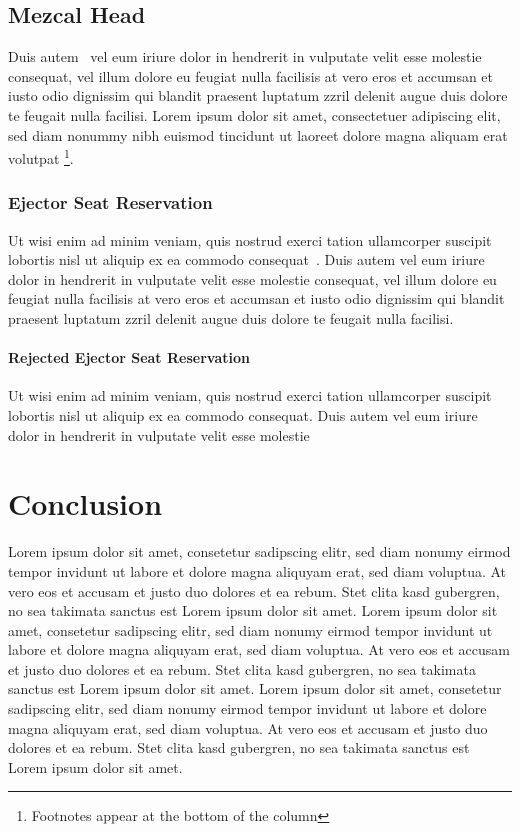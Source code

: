 \documentclass{vgtc}                          %
\begin{document}
\subsection{Mezcal Head}

Duis autem~\cite{Lorensen:1987:MCA} vel eum iriure dolor in hendrerit
in vulputate velit esse molestie consequat, vel illum dolore eu
feugiat nulla facilisis at vero eros et accumsan et iusto odio
dignissim qui blandit praesent luptatum zzril delenit augue duis
dolore te feugait nulla facilisi. Lorem ipsum dolor sit amet,
consectetuer adipiscing elit, sed diam nonummy nibh euismod tincidunt
ut laoreet dolore magna aliquam erat volutpat%
\footnote{Footnotes appear at the bottom of the column}.


\subsubsection{Ejector Seat Reservation}

Ut wisi enim ad minim veniam, quis nostrud exerci tation ullamcorper
suscipit lobortis nisl ut aliquip ex ea commodo
consequat~\cite{Nielson:1991:TAD}. Duis autem vel eum iriure dolor in
hendrerit in vulputate velit esse molestie consequat, vel illum dolore
eu feugiat nulla facilisis at vero eros et accumsan et iusto odio
dignissim qui blandit praesent luptatum zzril delenit augue duis
dolore te feugait nulla facilisi.

\paragraph{Rejected Ejector Seat Reservation}

Ut wisi enim ad minim veniam, quis nostrud exerci tation ullamcorper
suscipit lobortis nisl ut aliquip ex ea commodo consequat. Duis autem
vel eum iriure dolor in hendrerit in vulputate velit esse molestie

\section{Conclusion}

Lorem ipsum dolor sit amet, consetetur sadipscing elitr, sed diam
nonumy eirmod tempor invidunt ut labore et dolore magna aliquyam erat,
sed diam voluptua. At vero eos et accusam et justo duo dolores et ea
rebum. Stet clita kasd gubergren, no sea takimata sanctus est Lorem
ipsum dolor sit amet. Lorem ipsum dolor sit amet, consetetur
sadipscing elitr, sed diam nonumy eirmod tempor invidunt ut labore et
dolore magna aliquyam erat, sed diam voluptua. At vero eos et accusam
et justo duo dolores et ea rebum. Stet clita kasd gubergren, no sea
takimata sanctus est Lorem ipsum dolor sit amet. Lorem ipsum dolor sit
amet, consetetur sadipscing elitr, sed diam nonumy eirmod tempor
invidunt ut labore et dolore magna aliquyam erat, sed diam
voluptua. At vero eos et accusam et justo duo dolores et ea
rebum. Stet clita kasd gubergren, no sea takimata sanctus est Lorem
ipsum dolor sit amet.
\end{document}
